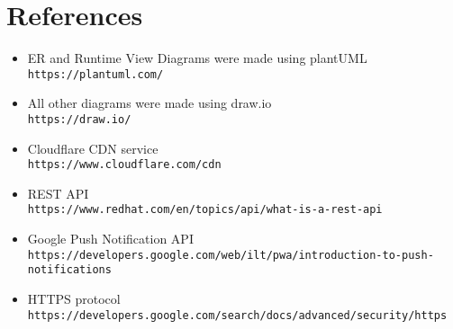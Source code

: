 
\section{References}
\begin{itemize}
    \item ER and Runtime View Diagrams were made using plantUML\\\texttt{https://plantuml.com/}
    \item All other diagrams were made using draw.io\\\texttt{https://draw.io/}
    \item Cloudflare CDN service\\\texttt{https://www.cloudflare.com/cdn}
    \item REST API\\\texttt{https://www.redhat.com/en/topics/api/what-is-a-rest-api}
    \item Google Push Notification API\\\texttt{https://developers.google.com/web/ilt/pwa/introduction-to-push-notifications}
    \item HTTPS protocol\\\texttt{https://developers.google.com/search/docs/advanced/security/https}
\end{itemize}
